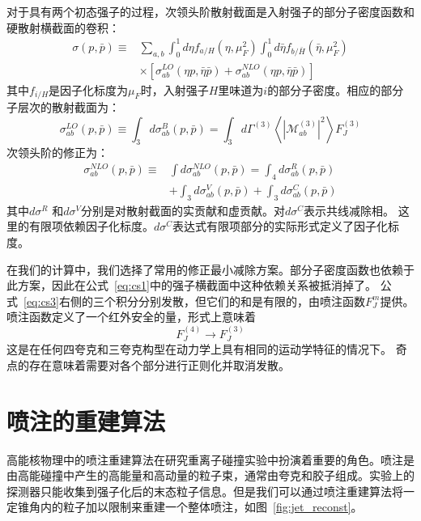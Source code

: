 对于具有两个初态强子的过程，次领头阶散射截面是入射强子的部分子密度函数和硬散射横截面的卷积：
\begin{equation}
	\begin{aligned}
		\sigma(p, \bar{p}) \equiv & \sum_{a, b} \int_0^1 d \eta f_{a / H}\left(\eta, \mu_F^2\right) \int_0^1 d \bar{\eta} f_{b / \bar{H}}\left(\bar{\eta}, \mu_F^2\right) \\
		& \times\left[\sigma_{a b}^{L O}(\eta p, \bar{\eta} \bar{p})+\sigma_{a b}^{N L O}(\eta p, \bar{\eta} \bar{p})\right]
			\label{eq:cs1}
	\end{aligned}
\end{equation}
其中$f_{i/H}$是因子化标度为$\mu_F$时，入射强子$H$里味道为$i$的部分子密度。相应的部分子层次的散射截面为：
\begin{equation}
	\sigma_{a b}^{L O}(p, \bar{p}) \equiv \int_3 d \sigma_{a b}^B(p, \bar{p})=\int_3 d \Gamma^{(3)}\left\langle\left|\mathcal{M}_{a b}^{(3)}\right|^2\right\rangle F_J^{(3)}
		\label{eq:cs2}
\end{equation}
次领头阶的修正为：
\begin{equation}
	\begin{aligned}
		\sigma_{a b}^{N L O}(p, \bar{p}) \equiv & \int d \sigma_{a b}^{N L O}(p, \bar{p})=\int_4 d \sigma_{a b}^R(p, \bar{p}) \\
		& +\int_3 d \sigma_{a b}^V(p, \bar{p})+\int_3 d \sigma_{a b}^C(p, \bar{p})
	\end{aligned}
			\label{eq:cs3}
\end{equation}
其中$d\sigma^R$ 和$d\sigma^V$分别是对散射截面的实贡献和虚贡献。对$d\sigma^C$表示共线减除相。
这里的有限项依赖因子化标度。$d\sigma^C$表达式有限项部分的实际形式定义了因子化标度。

在我们的计算中，我们选择了常用的修正最小减除方案。部分子密度函数也依赖于此方案，因此在公式~\ref{eq:cs1}中的强子横截面中这种依赖关系被抵消掉了。
公式~\ref{eq:cs3}右侧的三个积分分别发散，但它们的和是有限的，由喷注函数$F_J^{m}$提供。喷注函数定义了一个红外安全的量，形式上意味着
\begin{equation}
	F_J^{(4)} \to F_J^{(3)}
\end{equation}
这是在任何四夸克和三夸克构型在动力学上具有相同的运动学特征的情况下。
奇点的存在意味着需要对各个部分进行正则化并取消发散。










\section{喷注的重建算法}
	高能核物理中的喷注重建算法在研究重离子碰撞实验中扮演着重要的角色。喷注是由高能碰撞中产生的高能量和高动量的粒子束，通常由夸克和胶子组成。实验上的探测器只能收集到强子化后的末态粒子信息。但是我们可以通过喷注重建算法将一定锥角内的粒子加以限制来重建一个整体喷注，如图~\ref{fig:jet_reconst}。


